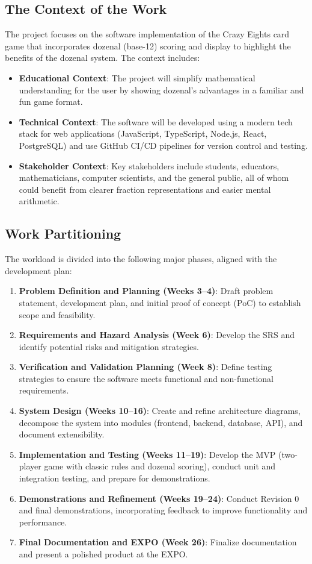 \documentclass[12pt]{article}
\begin{document}
\subsection{The Context of the Work}

The project focuses on the software implementation of the Crazy Eights card game that incorporates dozenal (base-12) scoring and display to highlight the benefits of the dozenal system. The context includes:

\begin{itemize}
    \item \textbf{Educational Context}: The project will simplify mathematical understanding for the user by showing dozenal's advantages in a familiar and fun game format.
    \item \textbf{Technical Context}: The software will be developed using a modern tech stack for web applications (JavaScript, TypeScript, Node.js, React, PostgreSQL) and use GitHub CI/CD pipelines for version control and testing.
    \item \textbf{Stakeholder Context}: Key stakeholders include students, educators, mathematicians, computer scientists, and the general public, all of whom could benefit from clearer fraction representations and easier mental arithmetic.
\end{itemize}

\subsection{Work Partitioning}

The workload is divided into the following major phases, aligned with the development plan:

\begin{enumerate}
    \item \textbf{Problem Definition and Planning (Weeks 3--4)}: Draft problem statement, development plan, and initial proof of concept (PoC) to establish scope and feasibility.
    \item \textbf{Requirements and Hazard Analysis (Week 6)}: Develop the SRS and identify potential risks and mitigation strategies.
    \item \textbf{Verification and Validation Planning (Week 8)}: Define testing strategies to ensure the software meets functional and non-functional requirements.
    \item \textbf{System Design (Weeks 10--16)}: Create and refine architecture diagrams, decompose the system into modules (frontend, backend, database, API), and document extensibility.
    \item \textbf{Implementation and Testing (Weeks 11--19)}: Develop the MVP (two-player game with classic rules and dozenal scoring), conduct unit and integration testing, and prepare for demonstrations.
    \item \textbf{Demonstrations and Refinement (Weeks 19--24)}: Conduct Revision 0 and final demonstrations, incorporating feedback to improve functionality and performance.
    \item \textbf{Final Documentation and EXPO (Week 26)}: Finalize documentation and present a polished product at the EXPO.
\end{enumerate}
\end{document}
